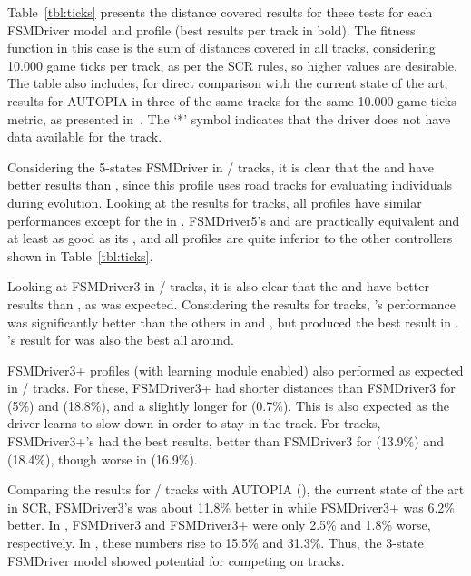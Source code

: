 Table~\ref{tbl:ticks} presents the distance covered results for these tests for each FSMDriver model and profile (best results per track in bold). The fitness function in this case is the sum of distances covered in all tracks, considering 10.000 game ticks per track, as per the SCR rules, so higher values are desirable. The table also includes, for direct comparison with the current state of the art, results for AUTOPIA in three of the same tracks for the same 10.000 game ticks metric, as presented in~\cite{AUTOPIA2009}. The `*' symbol indicates that the driver does not have data available for the track.

Considering the 5-states FSMDriver in / tracks, it is clear that the  and  have better results than , since this profile uses road tracks for evaluating individuals during evolution. Looking at the results for  tracks, all profiles have similar performances except for the  in .  FSMDriver5's  and  are practically equivalent and at least as good as its , and all profiles are quite inferior to the other controllers shown in Table~\ref{tbl:ticks}.

Looking at FSMDriver3 in / tracks, it is also clear that the  and  have better results than , as was expected. Considering the results for  tracks, 's performance was significantly better than the others in  and , but  produced the best result in .  's result for  was also the best all around.

FSMDriver3+ profiles (with learning module enabled) also performed as expected in / tracks. For these, FSMDriver3+ had shorter distances than FSMDriver3 for  (5\%) and  (18.8\%), and a slightly longer for  (0.7\%). This is also expected as the driver learns to slow down in order to stay in the track. For  tracks, FSMDriver3+'s  had the best results, better than FSMDriver3 for  (13.9\%) and  (18.4\%), though worse in  (16.9\%). 

Comparing the results for / tracks with AUTOPIA (\cite{AUTOPIA2009}), the current state of the art in SCR, FSMDriver3's  was about 11.8\% better in  while FSMDriver3+ was 6.2\% better. In , FSMDriver3 and FSMDriver3+ were only 2.5\% and 1.8\% worse, respectively. In , these numbers rise to 15.5\% and 31.3\%. Thus, the 3-state FSMDriver model showed potential for competing on  tracks.

